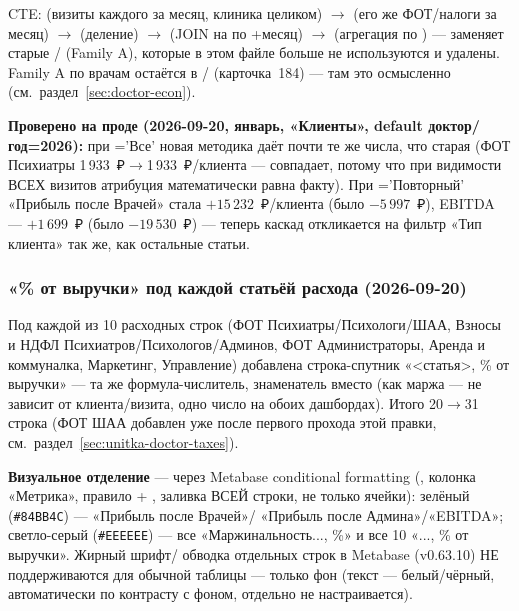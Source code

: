 \documentclass[11pt,a4paper]{article}
\newcommand{\code}[1]{\texttt{\detokenize{#1}}}
\begin{document}
CTE: \texttt{} (визиты каждого \texttt{} за
месяц, клиника целиком) $\to$ \texttt{} (его же ФОТ/налоги
за месяц) $\to$ \texttt{} (деление) $\to$
\texttt{} (JOIN на \texttt{} по
\texttt{}+месяц) $\to$ \texttt{} (агрегация
по \texttt{}) --- заменяет старые \texttt{}/
\texttt{} (Family A), которые в этом файле больше не
используются и удалены. Family A по врачам остаётся в
\texttt{}/\texttt{} (карточка~184) ---
там это осмысленно (см.\ раздел~\ref{sec:doctor-econ}).

\textbf{Проверено на проде (2026-09-20, январь, «Клиенты», default
доктор/год=2026):} при \texttt{}='Все' новая методика даёт
почти те же числа, что старая (ФОТ Психиатры 1\,933~₽$\to$1\,933~₽/клиента
--- совпадает, потому что при видимости ВСЕХ визитов атрибуция
математически равна факту). При \texttt{}='Повторный'
«Прибыль после Врачей» стала $+15\,232$~₽/клиента (было $-5\,997$~₽),
EBITDA --- $+1\,699$~₽ (было $-19\,530$~₽) --- теперь каскад откликается
на фильтр «Тип клиента» так же, как остальные статьи.

\subsubsection{«\% от выручки» под каждой статьёй расхода (2026-09-20)}
\label{sec:unitka-pct-of-revenue}

Под каждой из 10 расходных строк (ФОТ Психиатры/Психологи/ШАА, Взносы и
НДФЛ Психиатров/Психологов/Админов, ФОТ Администраторы, Аренда и
коммуналка, Маркетинг, Управление) добавлена строка-спутник «<статья>,
\% от выручки» --- та же формула-числитель, знаменатель \texttt{}
вместо \texttt{} (как маржа --- не зависит от клиента/визита,
одно число на обоих дашбордах). Итого 20$\to$31 строка (ФОТ ШАА добавлен
уже после первого прохода этой правки, см.\ раздел~\ref{sec:unitka-doctor-taxes}).

\textbf{Визуальное отделение} --- через Metabase conditional formatting
(\texttt{}, колонка «Метрика», правило
\code{operator="="} + \code{highlight\_row=true}, заливка ВСЕЙ строки, не
только ячейки): зелёный (\texttt{\#84BB4C}) --- «Прибыль после Врачей»/
«Прибыль после Админа»/«EBITDA»; светло-серый (\texttt{\#EEEEEE}) --- все
«Маржинальность..., \%» и все 10 «..., \% от выручки». Жирный шрифт/
обводка отдельных строк в Metabase (v0.63.10) НЕ поддерживаются для
обычной таблицы --- только фон (текст --- белый/чёрный, автоматически
по контрасту с фоном, отдельно не настраивается).
\end{document}
